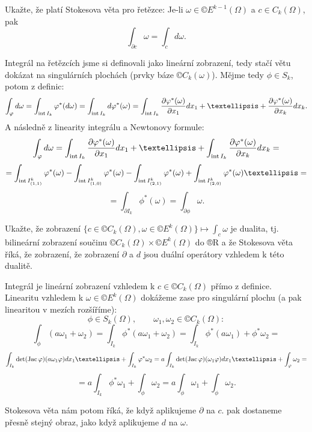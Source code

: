 \documentclass[12pt]{article}                   %
\begin{document}
\pagebreak

\begin{priklad}[3.2]
    Ukažte, že platí Stokesova věta pro řetězce: Je-li $\omega \in ©E^{k-1}(\Omega)$ a $c \in C_k(\Omega)$, pak
    $$ \int_{\partial c}\omega = \int_c d\omega. $$

    \begin{dukazin}
        Integrál na řetězcích jsme si definovali jako lineární zobrazení, tedy stačí větu dokázat na singulárních plochách (prvky báze $©C_k(\omega)$). Mějme tedy $\phi \in S_k$, potom z definic:
        $$ \int_\phi d\omega = \int_{\Int I_k} \phi^*(d\omega) = \int_{\Int I_k} d\phi^*(\omega) = \int_{\Int I_k} \frac{\partial \phi^*(\omega)}{\partial x_1}dx_1 + … + \frac{\partial \phi^*(\omega)}{\partial x_k}dx_k. $$
        A následně z linearity integrálu a Newtonovy formule:
        $$ \int_\phi d\omega = \int_{\Int I_k} \frac{\partial \phi^*(\omega)}{\partial x_1}dx_1 + … + \int_{\Int I_k} \frac{\partial \phi^*(\omega)}{\partial x_k}dx_k = $$
        $$ = \int_{\Int I^k_{(1, 1)}} \phi^*(\omega) - \int_{\Int I^k_{(1, 0)}} \phi^*(\omega) - \int_{\Int I^k_{(2, 1)}} \phi^*(\omega) + \int_{\Int I^k_{(2, 0)}} \phi^*(\omega) … = $$
        $$ = \int_{\partial I_k} \phi^*(\omega) = \int_{\partial \phi} \omega. $$
    \end{dukazin}
\end{priklad}

\pagebreak

\begin{priklad}[3.3]
    Ukažte, že zobrazení $\{c \in ©C_k(\Omega), \omega \in ©E^k(\Omega)\} \mapsto \int_c \omega$ je dualita, tj. bilineární zobrazení součinu $©C_k(\Omega) \times ©E^k(\Omega)$ do ®R a že Stokesova věta říká, že zobrazení, že zobrazení $\partial$ a $d$ jsou duální operátory vzhledem k této dualitě.

    \begin{dukazin}
        Integrál je lineární zobrazení vzhledem k $c \in ©C_k(\Omega)$ přímo z definice. Linearitu vzhledem k $\omega \in ©E^k(\Omega)$ dokážeme zase pro singulární plochu (a pak linearitou v mezích rozšíříme):
        $$ \phi \in S_k(\Omega), \qquad \omega_1, \omega_2 \in ©C_k(\Omega): $$ 
        $$ \int_\phi (a\omega_1 + \omega_2) = \int_{I_k} \phi^*(a \omega_1 + \omega_2) = \int_{I_k} \phi^*(a\omega_1) + \phi^*\omega_2 = $$
        $$ \int_{I_k} \det(\Jac \phi)(a\omega_1 \phi) dx_1… + \int_{I_k} \phi^*\omega_2 = a\int_{I_k} \det(\Jac \phi)(\omega_1 \phi) dx_1… + \int_{\phi}\omega_2 = $$
        $$ = a\int_{I_k}\phi^*\omega_1 + \int_{\phi}\omega_2  = a\int_{\phi}\omega_1 + \int_{\phi}\omega_2. $$

        Stokesova věta nám potom říká, že když aplikujeme $\partial$ na $c$. pak dostaneme přesně stejný obraz, jako když aplikujeme $d$ na $\omega$.
    \end{dukazin}
\end{priklad}
\end{document}
